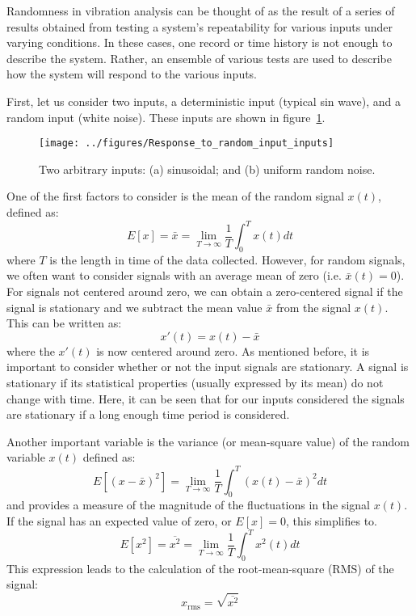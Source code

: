 \documentclass[12pt,letter]{article}
\begin{document}
Randomness in vibration analysis can be thought of as the result of a series of results obtained from testing a system's repeatability for various inputs under varying conditions. In these cases, one record or time history is not enough to describe the system. Rather, an ensemble of various tests are used to describe how the system will respond to the various inputs. 

First, let us consider two inputs, a deterministic input (typical sin wave), and a random input (white noise). These inputs are shown in figure~\ref{fig:Response_to_random_input_inputs}. 

\begin{figure}[H]
	\centering
	\texttt{[image: ../figures/Response\_to\_random\_input\_inputs]}
	\caption{Two arbitrary inputs: (a) sinusoidal; and (b) uniform random noise.}
	\label{fig:Response_to_random_input_inputs}
\end{figure}

One of the first factors to consider is the mean of the random signal $x(t)$, defined as:
\begin{equation}
E[x] = \bar{x} = \lim\limits_{T \rightarrow \infty} \frac{1}{T} \int_{0}^{T}x(t)dt
\end{equation}
where $T$ is the length in time of the data collected. However, for random signals, we often want to consider signals with an average mean of zero (i.e. $\bar{x}(t)=0$). For signals not centered around zero, we can obtain a zero-centered signal if the signal is stationary and we subtract the mean value $\bar{x}$ from the signal $x(t)$. This can be written as:
\begin{equation}
x'(t) = x(t) - \bar{x}
\end{equation} 
where the $x'(t)$ is now centered around zero. As mentioned before, it is important to consider whether or not the input signals are stationary. A signal is stationary if its statistical properties (usually expressed by its mean) do not change with time. Here, it can be seen that for our inputs considered the signals are stationary if a long enough time period is considered. 

Another important variable is the variance (or mean-square value) of the random variable $x(t)$ defined as:
\begin{equation}
E[(x-\bar{x})^2] = \lim\limits_{T \rightarrow \infty} \frac{1}{T} \int_{0}^{T}(x(t)-\bar{x})^2dt
\end{equation}
and provides a measure of the magnitude of the fluctuations in the signal $x(t)$. If the signal has an expected value of zero, or $E[x]=0$, this simplifies to. 
\begin{equation}
E[x^2] = \overline{x^2} = \lim\limits_{T \rightarrow \infty} \frac{1}{T} \int_{0}^{T}x^2(t)dt
\end{equation}
This expression leads to the calculation of the root-mean-square (RMS) of the signal:
\begin{equation}
x_\text{rms} = \sqrt{\overline{x^2}} 
\end{equation}
\end{document}
